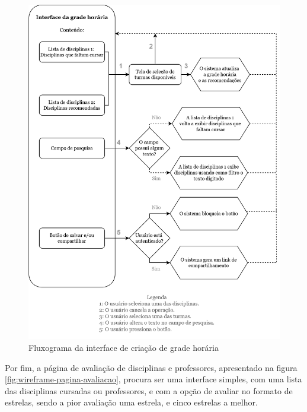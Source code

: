 \begin{figure}[ht]
    \begin{center}
    \includegraphics[width=390pt]{figuras/fluxograma-grade.png}
    \caption{Fluxograma da interface de criação de grade horária}
    \label{fig:fluxograma-grade}
    \end{center}
\end{figure}

Por fim, a página de avaliação de disciplinas e professores, apresentado na figura \ref{fig:wireframe-pagina-avaliacao}, procura ser uma interface simples, com uma lista das disciplinas cursadas ou professores, e com a opção de avaliar no formato de estrelas, sendo a pior avaliação uma estrela, e cinco estrelas a melhor.

